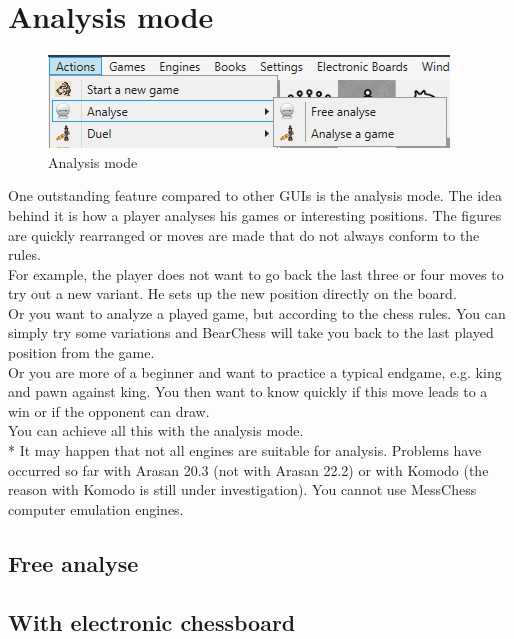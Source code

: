 \documentclass[11pt,a4paper]{article}
\begin{document}
\section{Analysis mode} \label{AnalyzeMode}


\begin{figure}[H]
	\centering
	\includegraphics[scale=1.0]{AnalyzeMode.png}
	\caption{Analysis mode}
	\label{fig:AnalyzeMode}
\end{figure}


One outstanding feature compared to other GUIs is the analysis mode. The idea behind it is how a player analyses his games or interesting positions. The figures are quickly rearranged or moves are made that do not always conform to the rules.\\
For example, the player does not want to go back the last three or four moves to try out a new variant. He sets up the new position directly on the board.\\
Or you want to analyze a played game, but according to the chess rules. You can simply try some variations and BearChess will take you back to the last played position from the game.\\
Or you are more of a beginner and want to practice a typical endgame, e.g. king and pawn against king. You then want to know quickly if this move leads to a win or if the opponent can draw.\\
You can achieve all this with the analysis mode.\\


{\color{red}*} It may happen that not all engines are suitable for analysis. Problems have occurred so far with Arasan 20.3 (not with Arasan 22.2) or with Komodo (the reason with Komodo is still under investigation). You cannot use MessChess computer emulation engines.

\subsection{Free analyse} \label{AnalyzeMode1}

\subsection{With electronic chessboard}
\end{document}
